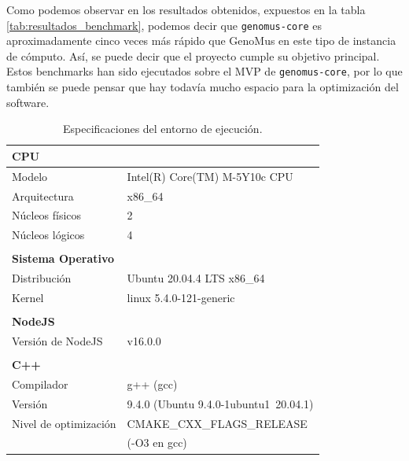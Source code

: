 Como podemos observar en los resultados obtenidos, expuestos en la tabla \ref{tab:resultados_benchmark}, podemos decir que \verb|genomus-core| es aproximadamente cinco veces más rápido que GenoMus en este tipo de instancia de cómputo. Así, se puede decir que el proyecto cumple su objetivo principal. Estos benchmarks han sido ejecutados sobre el MVP de \verb|genomus-core|, por lo que también se puede pensar que hay todavía mucho espacio para la optimización del software.

\begin{table}[]
    \centering
    \begin{tabular}{p{4cm} p{7cm}}
        \textbf{CPU} &  \\ \hline \hline
        Modelo & Intel(R) Core(TM) M-5Y10c CPU \\ 
        Arquitectura & x86\_64 \\
        Núcleos físicos & 2 \\
        Núcleos lógicos & 4 \\
        & \\
        \textbf{Sistema Operativo} & \\ \hline \hline
        Distribución & Ubuntu 20.04.4 LTS x86\_64 \\
        Kernel & linux 5.4.0-121-generic \\
        & \\        
        \textbf{NodeJS} & \\ \hline \hline
        Versión de NodeJS & v16.0.0 \\
        & \\
        \textbf{C++} & \\ \hline \hline
        Compilador & g++ (gcc) \\
        Versión & 9.4.0 (Ubuntu 9.4.0-1ubuntu1~20.04.1) \\
        Nivel de optimización & CMAKE\_CXX\_FLAGS\_RELEASE \\
        & (-O3 en gcc)
        
    \end{tabular}
    \caption{Especificaciones del entorno de ejecución.}
    \label{tab:datos_entorno_test}
\end{table}

